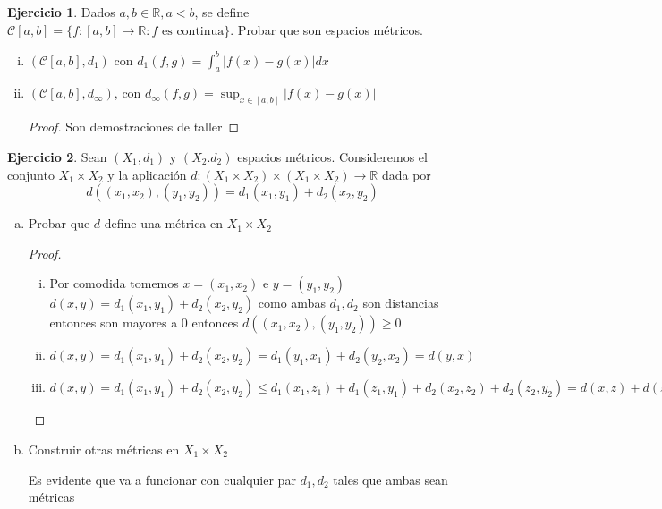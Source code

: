 \documentclass[12pt]{article}
\newcommand{\R}{\mathbb{R}}
\newcommand{\ra}{\rightarrow}
\theoremstyle{definition}
\newtheorem{ej}{Ejercicio}
\begin{document}
\begin{ej}
  Dados $a,b \in \R, a < b$, se define $\mathcal{C}[a,b] = \{f:[a,b ] \ra \R : f \text{ es continua}\}$. Probar que son espacios métricos.
  \begin{enumerate}[i.]
    \item $(\mathcal{C}[a,b],d_{1})$ con $d_{1}(f,g) = \int_{a}^{b} | f(x) - g(x)|dx$
      
    \item $(\mathcal{C}[a,b],d_{\infty})$, con $d_{\infty}(f,g) = \sup_{x \in [a,b]}|f(x) - g(x)|$
      \begin{proof}
Son demostraciones de taller	
      \end{proof}
  \end{enumerate}
\end{ej}
\newpage
\begin{ej}
Sean $(X_{1},d_{1})$ y $(X_{2}.d_{2})$ espacios métricos. Consideremos el conjunto $X_{1} \times X_{2}$ y la aplicación $d: (X_{1} \times X_{2}) \times (X_{1} \times X_{2}) \ra \R$ dada por $$d((x_{1},x_{2}),(y_{1},y_{2}) ) = d_{1}(x_{1},y_{1}) + d_{2}(x_{2},y_{2})$$ 

\begin{enumerate}[(a)]
    \item Probar que $d$ define una métrica en $X_{1} \times X_{2}$
      \begin{proof}
	\begin{enumerate}[i.]
	  \item Por comodida tomemos $x = (x_{1},x_{2})$ e $y = (y_{1},y_{2})$  $d(x,y) = d_{1}(x_{1},y_{1}) + d_{2}(x_{2},y_{2})$ como ambas $d_{1},d_{2}$ son distancias entonces son mayores a $0$ entonces   $d((x_{1},x_{2}),(y_{1},y_{2})) \geq 0$
	  \item $d(x,y) =  d_{1}(x_{1},y_{1}) + d_{2}(x_{2},y_{2}) =  d_{1}(y_{1},x_{1}) + d_{2}(y_{2},x_{2}) = d(y,x)   $
	  \item $d(x,y) =  d_{1}(x_{1},y_{1}) + d_{2}(x_{2},y_{2}) \leq d_{1}(x_{1},z_{1}) + d_{1}(z_{1},y_{1}) + d_{2}(x_{2},z_{2}) + d_{2}(z_{2},y_{2}) = d(x,z) + d(z,y) $
	\end{enumerate}
	  \end{proof}
    \item Construir otras métricas en $X_{1} \times X_{2}$

Es evidente que va a funcionar con cualquier par $d_{1},d_{2}$ tales que ambas sean métricas
  \end{enumerate}
\end{ej}
\end{document}
